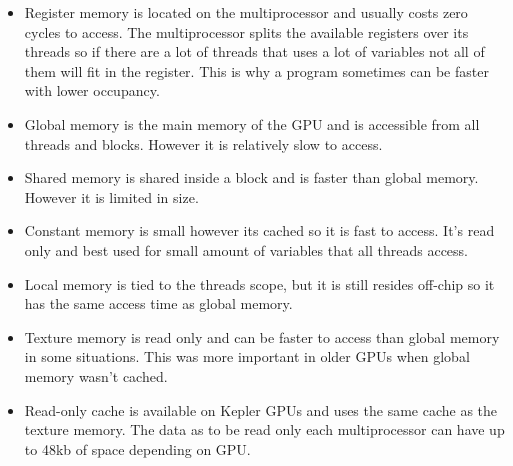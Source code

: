 \documentclass[10pt,a4paper]{report}
\begin{document}
\begin{itemize}
  \item Register memory is located on the multiprocessor and usually costs zero cycles to access. The multiprocessor splits the available registers over its threads so if there are a lot of threads that uses a lot of variables not all of them will fit in the register. This is why a program sometimes can be faster with lower occupancy.\cite{cuda}
  \item Global memory is the main memory of the GPU and is accessible from all threads and blocks. However it is relatively slow to access.\cite{cuda}
  \item Shared memory is shared inside a block and is faster than global memory. However it is limited in size.\cite{cuda}
  \item Constant memory is small however its cached so it is fast to access. It's read only and best used for small amount of variables that all threads access.\cite{cuda}
  \item Local memory is tied to the threads scope, but it is still resides off-chip so it has the same access time as global memory.\cite{cuda}
  \item Texture memory is read only and can be faster to access than global memory in some situations. This was more important in older GPUs when global memory wasn't cached.\cite{plink_gpu, cuda}
  \item Read-only cache is available on Kepler GPUs and uses the same cache as the texture memory. The data as to be read only each multiprocessor can have up to 48kb of space depending on GPU.\cite{kepler_tuning_guide}
\end{itemize}
\end{document}

